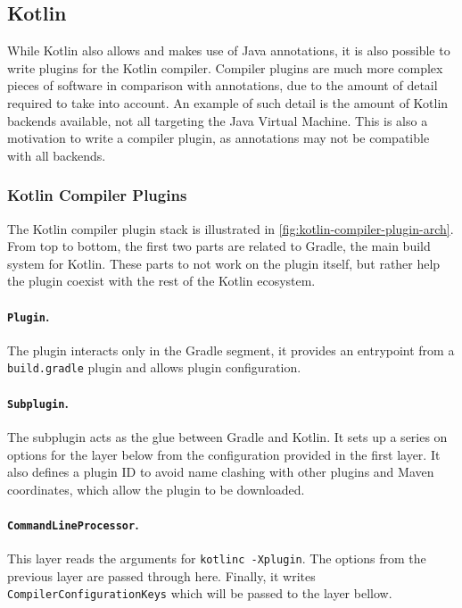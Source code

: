 

\subsection{Kotlin}\label{sec:lang-preprocessors:kotlin}

While Kotlin also allows and makes use of Java annotations, it is also possible to write plugins for the Kotlin compiler.
Compiler plugins are much more complex pieces of software in comparison with annotations,
due to the amount of detail required to take into account.
An example of such detail is the amount of Kotlin backends available, not all targeting the Java Virtual Machine.
This is also a motivation to write a compiler plugin, as annotations may not be compatible with all backends.

\subsubsection*{Kotlin Compiler Plugins}\label{sec:lang-preprocessors:kotlin:annotation}
The Kotlin compiler plugin stack is illustrated in \autoref{fig:kotlin-compiler-plugin-arch}.
From top to bottom, the first two parts are related to Gradle, the main build system for Kotlin.
These parts to not work on the plugin itself, but rather help the plugin coexist with the rest of the Kotlin ecosystem.

\paragraph{\texttt{Plugin}.}
The plugin interacts only in the Gradle segment,
it provides an entrypoint from a \texttt{build.gradle} plugin and allows plugin configuration.

\paragraph{\texttt{Subplugin}.}
The subplugin acts as the glue between Gradle and Kotlin.
It sets up a series on options for the layer below from the configuration provided in the first layer.
It also defines a plugin ID to avoid name clashing with other plugins and Maven coordinates, which allow the plugin to be downloaded.

\paragraph{\texttt{CommandLineProcessor}.}
This layer reads the arguments for \texttt{kotlinc -Xplugin}.
The options from the previous layer are passed through here.
Finally, it writes \texttt{CompilerConfigurationKeys} which will be passed to the layer bellow.

